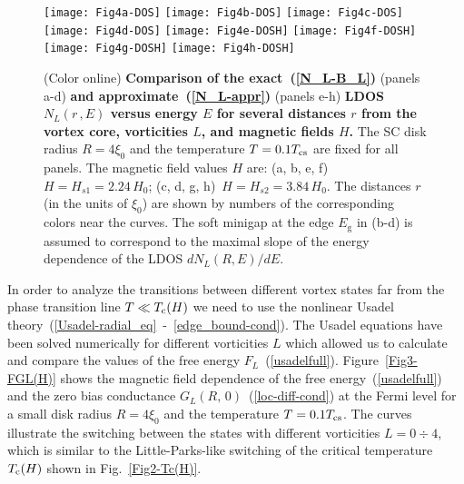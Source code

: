 \documentclass[prx,twocolumn,aps,superscriptaddress,showpacs,amsmath,amssymb,footnoteinbib]{revtex4-1}
\begin{document}
%
\begin{figure*}[t]
\texttt{[image: Fig4a-DOS]}
\texttt{[image: Fig4b-DOS]}
\texttt{[image: Fig4c-DOS]}
\texttt{[image: Fig4d-DOS]}
\texttt{[image: Fig4e-DOSH]}
\texttt{[image: Fig4f-DOSH]}
\texttt{[image: Fig4g-DOSH]}
\texttt{[image: Fig4h-DOSH]}
\caption{(Color online) \textbf{Comparison of the
exact~(\ref{N_L-B_L})} (panels a-d) \textbf{and
approximate~(\ref{N_L-appr})} (panels e-h) \textbf{LDOS
$N_L(r\,,E)$ versus energy $E$ for several distances $r$ from the
vortex core, vorticities $L$, and magnetic fields $H$.}
The SC disk radius $R = 4 \xi_0$ and the temperature $T = 0.1
T_{\rm cs}$ are fixed for all panels. The magnetic field values
$H$ are: (a, b, e, f)~$H = H_{s1} = 2.24\,H_0$; (c, d, g, h)~$H =
H_{s2} = 3.84\,H_0$. The distances $r$ (in the units of $\xi_0$)
are shown by numbers of the corresponding colors near the curves.
The soft minigap at the edge $E_\mathrm{g}$ in (b-d) is assumed to
correspond to the maximal slope of the energy dependence of the
LDOS $d N_L(R,E) / d E$.} \label{Fig-DOS}
\end{figure*}
%

In order to analyze the transitions between different vortex
states far from the phase transition line $T \ll T_{\rm c}(H)$ we
need to use the nonlinear Usadel theory~(\ref{Usadel-radial_eq}~-~\ref{edge_bound-cond}). The Usadel
equations have been solved numerically for different vorticities
$L$ which allowed us to calculate and compare the values of the
free energy $F_L$~(\ref{usadelfull}). Figure~\ref{Fig3-FGL(H)}
shows the magnetic field dependence of the free energy~(\ref{usadelfull}) and
the zero bias conductance $G_L(R,\,0)$~(\ref{loc-diff-cond}) at the Fermi level for a small disk radius
$R = 4 \xi_0$ and the temperature $T = 0. 1 T_{\rm cs}$. The
curves illustrate the switching between the states with different
vorticities $L = 0 \div 4$, which is similar to the Little-Parks-like
switching of the critical temperature $T_{\rm c}(H)$ shown in Fig.~\ref{Fig2-Tc(H)}.
\end{document}
